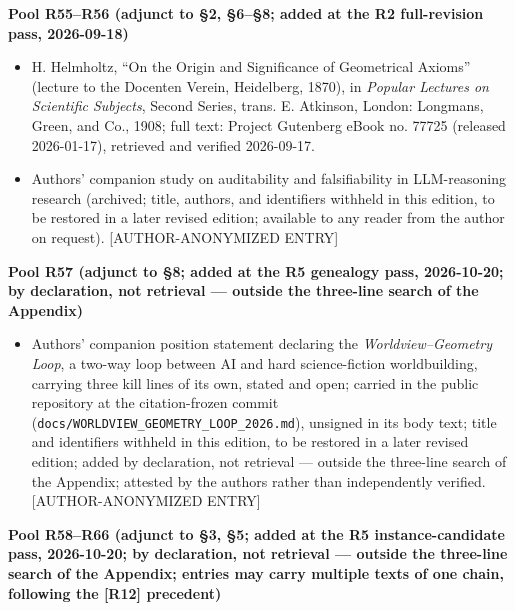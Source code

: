 \documentclass[11pt,a4paper]{article}
\begin{document}
\medskip
\noindent\textbf{Pool R55–R56 (adjunct to §2, §6–§8; added at the R2 full-revision pass, 2026-09-18)}\par\addvspace{2pt}

\begin{itemize}[leftmargin=1.6em,itemsep=2pt,parsep=0pt,topsep=3pt]
\item[R55.] H. Helmholtz, ``On the Origin and Significance of Geometrical Axioms'' (lecture to the Docenten Verein, Heidelberg, 1870), in \textit{Popular Lectures on Scientific Subjects}, Second Series, trans. E. Atkinson, London: Longmans, Green, and Co., 1908; full text: Project Gutenberg eBook no. 77725 (released 2026-01-17), retrieved and verified 2026-09-17.
\item[R56.] Authors' companion study on auditability and falsifiability in LLM-reasoning research (archived; title, authors, and identifiers withheld in this edition, to be restored in a later revised edition; available to any reader from the author on request). [AUTHOR-ANONYMIZED ENTRY]
\end{itemize}

\medskip
\noindent\textbf{Pool R57 (adjunct to §8; added at the R5 genealogy pass, 2026-10-20; by declaration, not retrieval — outside the three-line search of the Appendix)}\par\addvspace{2pt}

\begin{itemize}[leftmargin=1.6em,itemsep=2pt,parsep=0pt,topsep=3pt]
\item[R57.] Authors' companion position statement declaring the \textit{Worldview--Geometry Loop}, a two-way loop between AI and hard science-fiction worldbuilding, carrying three kill lines of its own, stated and open; carried in the public repository at the citation-frozen commit (\texttt{docs/WORLDVIEW\_GEOMETRY\_LOOP\_2026.md}), unsigned in its body text; title and identifiers withheld in this edition, to be restored in a later revised edition; added by declaration, not retrieval — outside the three-line search of the Appendix; attested by the authors rather than independently verified. [AUTHOR-ANONYMIZED ENTRY]
\end{itemize}

\medskip
\noindent\textbf{Pool R58–R66 (adjunct to §3, §5; added at the R5 instance-candidate pass, 2026-10-20; by declaration, not retrieval — outside the three-line search of the Appendix; entries may carry multiple texts of one chain, following the [R12] precedent)}\par\addvspace{2pt}
\end{document}
